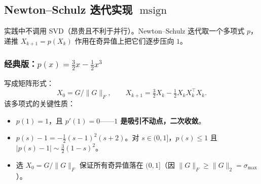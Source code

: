 \documentclass[11pt,a4paper]{article}
\theoremstyle{mythm}
\theoremstyle{mydef}
\newcommand{\msign}{\operatorname{msign}}
\begin{document}
\subsection{Newton--Schulz 迭代实现 $\msign$}

实践中不调用 SVD（昂贵且不利于并行）。Newton--Schulz 迭代取一个多项式 $p$，递推 $X_{k+1} = p(X_k)$ 作用在奇异值上把它们逐步压向 $1$。

\subsubsection*{经典版：$p(x) = \tfrac{3}{2}x - \tfrac{1}{2}x^3$}

写成矩阵形式：
\begin{equation}\label{eq:ns-classical}
X_0 = G/\|G\|_F,\qquad X_{k+1} = \tfrac{3}{2}X_k - \tfrac{1}{2} X_k X_k^\top X_k.
\end{equation}
该多项式的关键性质：
\begin{itemize}[leftmargin=2em]
\item $p(1) = 1$，且 $p'(1) = 0$——\textbf{$1$ 是吸引不动点，二次收敛}。
\item $p(s) - 1 = -\tfrac{1}{2}(s-1)^2(s+2)$。对 $s\in(0,1]$，$p(s)\le 1$ 且 $|p(s)-1|\sim \tfrac{3}{2}(1-s)^2$。
\item 选 $X_0 = G/\|G\|_F$ 保证所有奇异值落在 $(0,1]$（因 $\|G\|_F \ge \|G\|_2 = \sigma_{\max}$）。
\end{itemize}
\end{document}
